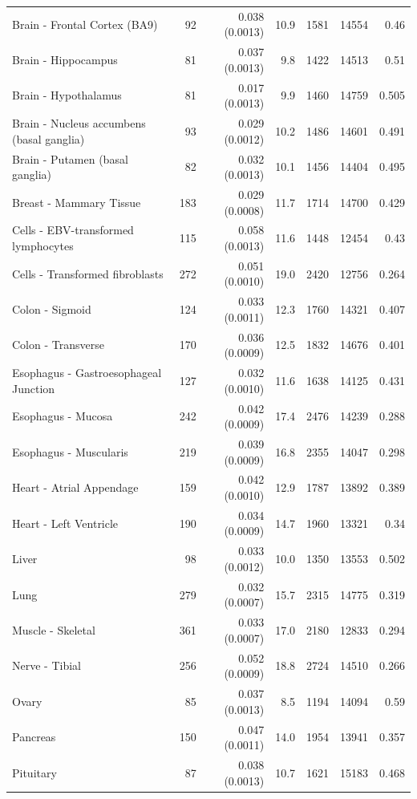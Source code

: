 \documentclass[10pt,letterpaper]{article}
\begin{document}
\begin{table}[!ht]
\begin{adjustwidth}{-2.25in}{0in}
\begin{tabular}{lrrrrrr}
  Brain - Frontal Cortex (BA9) & 92 & 0.038 (0.0013) & 10.9 & 1581 & 14554 & 0.46 \\ 
  Brain - Hippocampus & 81 & 0.037 (0.0013) & 9.8 & 1422 & 14513 & 0.51 \\ 
  Brain - Hypothalamus & 81 & 0.017 (0.0013) & 9.9 & 1460 & 14759 & 0.505 \\ 
  Brain - Nucleus accumbens (basal ganglia) & 93 & 0.029 (0.0012) & 10.2 & 1486 & 14601 & 0.491 \\ 
  Brain - Putamen (basal ganglia) & 82 & 0.032 (0.0013) & 10.1 & 1456 & 14404 & 0.495 \\ 
  Breast - Mammary Tissue & 183 & 0.029 (0.0008) & 11.7 & 1714 & 14700 & 0.429 \\ 
  Cells - EBV-transformed lymphocytes & 115 & 0.058 (0.0013) & 11.6 & 1448 & 12454 & 0.43 \\ 
  Cells - Transformed fibroblasts & 272 & 0.051 (0.0010) & 19.0 & 2420 & 12756 & 0.264 \\ 
  Colon - Sigmoid & 124 & 0.033 (0.0011) & 12.3 & 1760 & 14321 & 0.407 \\ 
  Colon - Transverse & 170 & 0.036 (0.0009) & 12.5 & 1832 & 14676 & 0.401 \\ 
  Esophagus - Gastroesophageal Junction & 127 & 0.032 (0.0010) & 11.6 & 1638 & 14125 & 0.431 \\ 
  Esophagus - Mucosa & 242 & 0.042 (0.0009) & 17.4 & 2476 & 14239 & 0.288 \\ 
  Esophagus - Muscularis & 219 & 0.039 (0.0009) & 16.8 & 2355 & 14047 & 0.298 \\ 
  Heart - Atrial Appendage & 159 & 0.042 (0.0010) & 12.9 & 1787 & 13892 & 0.389 \\ 
  Heart - Left Ventricle & 190 & 0.034 (0.0009) & 14.7 & 1960 & 13321 & 0.34 \\ 
  Liver & 98 & 0.033 (0.0012) & 10.0 & 1350 & 13553 & 0.502 \\ 
  Lung & 279 & 0.032 (0.0007) & 15.7 & 2315 & 14775 & 0.319 \\ 
  Muscle - Skeletal & 361 & 0.033 (0.0007) & 17.0 & 2180 & 12833 & 0.294 \\ 
  Nerve - Tibial & 256 & 0.052 (0.0009) & 18.8 & 2724 & 14510 & 0.266 \\ 
  Ovary & 85 & 0.037 (0.0013) & 8.5 & 1194 & 14094 & 0.59 \\ 
  Pancreas & 150 & 0.047 (0.0011) & 14.0 & 1954 & 13941 & 0.357 \\ 
  Pituitary & 87 & 0.038 (0.0013) & 10.7 & 1621 & 15183 & 0.468 \\ 

\end{tabular}
\end{adjustwidth}
\end{table}
\end{document}
